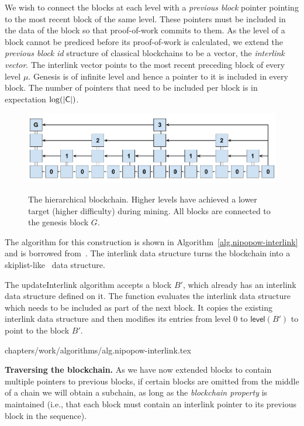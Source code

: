 We wish to connect the blocks at each level with a \emph{previous block}
pointer pointing to the most recent block of the same level. These pointers must
be included in the data of the block so that proof-of-work commits to them. As
the level of a block cannot be prediced before its proof-of-work is calculated,
we extend the \emph{previous block id} structure of classical blockchains to be
a vector, the \emph{interlink vector}. The interlink vector
points to the most recent preceding block of every level $\mu$. Genesis is of
infinite level and hence a pointer to it is included in every block. The number
of pointers that need to be included per block is in expectation
$\log(|\mathsf{C}|)$.

\begin{figure}
    \caption{The hierarchical blockchain.
    Higher levels have achieved a lower target (higher difficulty) during
    mining. All blocks are connected to the genesis block $G$.}
    \centering
    \includegraphics[width=0.7\columnwidth,keepaspectratio]{chapters/work/figures/hierarchical-ledger.png}
    \label{fig.hierarchy}
\end{figure}

The algorithm for this construction is shown in
Algorithm~\ref{alg.nipopow-interlink} and is borrowed from~\cite{popow}. The
interlink data structure turns the blockchain into a
skiplist-like~\cite{skiplist} data structure.

The updateInterlink algorithm accepts a block $B'$, which already has an
interlink data structure defined on it. The function evaluates the
interlink data structure which needs to be included as part of the next block.
It copies the existing interlink data structure and
then modifies its entries from level $0$ to $\textsf{level}(B')$ to
point to the block $B'$.

{chapters/work/algorithms/alg.nipopow-interlink.tex}

\noindent\textbf{Traversing the blockchain. }
As we have now extended blocks to contain multiple pointers to previous blocks,
if certain blocks are omitted from the middle of a chain we will obtain a
subchain, as long as the \emph{blockchain property} is maintained (i.e., that
each block must contain an interlink pointer to its previous block in the
sequence).

